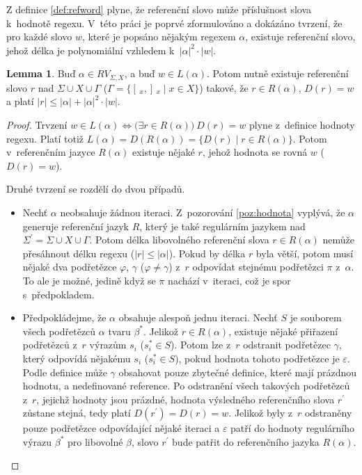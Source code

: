 \documentclass[thesis=B,czech]{FITthesis}[2019/12/23]
\theoremstyle{definition}
\newtheorem{lemma}{Lemma}[chapter]
\begin{document}
Z definice \ref{def:refword} plyne, že referenční slovo může  příslušnost slova k~hodnotě regexu. V~této práci je poprvé zformulováno a dokázáno tvrzení, že pro každé slovo $w$, které je popsáno nějakým regexem $\alpha$, existuje referenční slovo, jehož délka je polynomiální vzhledem k~$|\alpha|^2\cdot|w|$.

\begin{lemma}\label{lem:ref1}
Buď $\alpha \in RV_{\Sigma, X}$, a buď $w \in L(\alpha)$. Potom nutně existuje referenční slovo $r$ nad $\Sigma\cup X \cup\Gamma$ ($\Gamma = \{ [\,_x , ]\,_x \mid x \in X \}$) takové, že $r \in R(\alpha)$, $D(r) = w$ a platí $|r| \le |\alpha|+|\alpha|^2\cdot|w|$.
\end{lemma}

\begin{proof} Trvzení $w \in L(\alpha) \iff \bigg(\exists r \in R(\alpha)\bigg) \ D(r) = w$ plyne z~definice hodnoty regexu. Platí totiž $L(\alpha)=D(R(\alpha))=\{D(r) \mid r \in R(\alpha)\}$. Potom v~referenčním jazyce $R(\alpha)$ existuje nějaké $r$, jehož hodnota se rovná $w$ ($D(r)=w$).  

Druhé tvrzení se rozdělí do dvou případů. 
 \begin{itemize}
	\item{Nechť $\alpha$ neobsahuje žádnou iteraci. Z~pozorování \ref{poz:hodnota} vyplývá, že $\alpha$ generuje referenční jazyk $R$, který je také regulárním jazykem nad $\Sigma^\prime = \Sigma \cup X \cup \Gamma$. Potom délka libovolného referenční slova $r \in R(\alpha)$ nemůže přesáhnout délku regexu ($|r| \leq |\alpha|$). Pokud by délka $r$ byla větší, potom musí nějaké dva podřetězce $\varphi$, $\gamma$ ($\varphi \ne \gamma$) z~$r$ odpovídat stejnému podřetězci $\pi$ z~$\alpha$. To ale je možné, jedině když se $\pi$ nachází v~iteraci, což je spor s~předpokladem.}
	\item{Předpokládejme, že $\alpha$ obsahuje alespoň jednu iteraci. Nechť $S$ je souborem všech podřetězců $\alpha$ tvaru $\beta^\ast$. Jelikož $r \in R(\alpha)$, existuje nějaké přiřazení podřetězců z~$r$ výrazům $s_i$ ($s_i^\ast \in S$). Potom lze z~$r$ odstranit podřetězec $\gamma$, který odpovídá nějakému $s_i$ ($s_i^\ast \in S$), pokud hodnota tohoto podřetězce je $\varepsilon$. Podle definice může $\gamma$ obsahovat pouze zbytečné definice, které mají prázdnou hodnotu, a nedefinované reference. Po odstranění všech takových podřetězců z~$r$, jejichž hodnoty jsou prázdné, hodnota výsledného referenčního slova $r^\prime$ zůstane stejná, tedy platí $D(r^\prime)=D(r)=w$. Jelikož byly z~$r$ odstraněny pouze podřetězce odpovídající nějaké iteraci a $\varepsilon$ patří do hodnoty regulárního výrazu $\beta^\ast$ pro libovolné $\beta$, slovo $r^\prime$ bude patřit do referenčního jazyka $R(\alpha)$.  

}
\end{itemize}
\end{proof}
\end{document}
